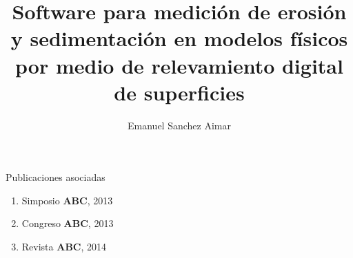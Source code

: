 \documentclass[12pt,screen,twoside,pagebackref]{tesis}
\title{Software para medici\'{o}n de erosi\'{o}n y sedimentaci\'{o}n en modelos f\'{i}sicos por medio de relevamiento digital de superficies}
\author{Emanuel Sanchez Aimar}
\begin{document}

\begin{preliminary}



\begin{abreviaturas}
\end{abreviaturas}

\tableofcontents                %

\listoffigures                  %

\listoftables                   %



\end{preliminary}







% 

\begin{biblio}

\end{biblio}

\begin{postliminary}

\begin{seccion}{Publicaciones asociadas}
  \begin{enumerate}
  \item Simposio \textbf{ABC}, 2013
  \item Congreso \textbf{ABC}, 2013
  \item Revista  \textbf{ABC}, 2014 
  \end{enumerate}
\end{seccion}


\end{postliminary}
\end{document}
